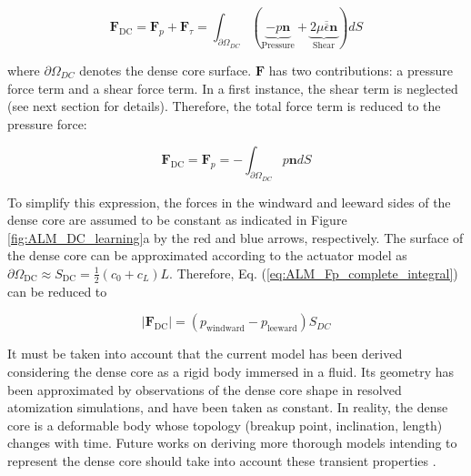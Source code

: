 \begin{equation}
\boldsymbol{F}_\mathrm{DC} = \boldsymbol{F}_p + \boldsymbol{F}_\tau = \int_{\partial \Omega_{DC}} \left( \underbrace{- p \boldsymbol{n}}_{\mathrm{Pressure}} + \underbrace{2 \mu \overline{\overline{\epsilon}} \boldsymbol{n}}_{\mathrm{Shear}}  \right) dS 
\end{equation}

where $\partial \Omega_{DC}$ denotes the dense core surface. $\boldsymbol{F} $ has two contributions: a pressure force term and a shear force term. In a first instance, the shear term is neglected (see next section for details). Therefore, the total force term is reduced to the pressure force:

\begin{equation}
\label{eq:ALM_Fp_complete_integral}
\boldsymbol{F}_\mathrm{DC} = \boldsymbol{F}_p = - \int_{\partial \Omega_{DC}} p \boldsymbol{n} dS 
\end{equation}

To simplify this expression, the forces in the windward and leeward sides of the dense core are assumed to be constant as indicated in Figure \ref{fig:ALM_DC_learning}a by the red and blue arrows, respectively. The surface of the dense core can be approximated according to the actuator model as $\partial \Omega_\mathrm{DC} \approx S_\mathrm{DC} = \frac{1}{2} \left( c_0 + c_L \right) L$. Therefore, Eq. (\ref{eq:ALM_Fp_complete_integral}) can be reduced to


\begin{equation}
\boxed{
|\boldsymbol{F}_\mathrm{DC}| = \left( p_\mathrm{windward} - p_\mathrm{leeward} \right) S_{DC} 
}
\end{equation}



It must be taken into account that the current model has been derived considering the dense core as a rigid body immersed in a fluid. Its geometry has been approximated by observations of the dense core shape in resolved atomization simulations, and have been taken as constant. In reality, the dense core is a deformable body whose topology (breakup point, inclination, length) changes with time. Future works on deriving more thorough models intending to represent the dense core should take into account these transient properties .

